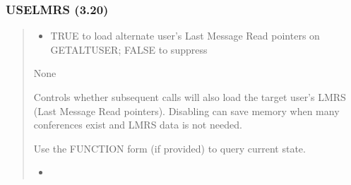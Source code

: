 \documentclass[letterpaper,10pt,english]{sphinxmanual}
\begin{document}
\subsubsection{USELMRS (3.20)}
\label{\detokenize{ppl:uselmrs-3-20}}\begin{quote}

\sphinxAtStartPar
{}
\begin{description}
\begin{itemize}
\item {} 
\sphinxAtStartPar
{} \textendash{} TRUE to load alternate user’s Last Message Read pointers on GETALTUSER; FALSE to suppress

\end{itemize}

\sphinxAtStartPar
None

\sphinxAtStartPar
Controls whether subsequent  calls will also load the target user’s LMRS (Last Message Read pointers).
Disabling can save memory when many conferences exist and LMRS data is not needed.

\end{description}

\sphinxAtStartPar
{}
\begin{quote}

\begin{sphinxVerbatim}[commandchars=\\\{\}]
 
 
 
 
 
 
\end{sphinxVerbatim}
\end{quote}
\begin{description}
\sphinxAtStartPar
Use the FUNCTION form  (if provided) to query current state.

\begin{itemize}
\item {} 
\sphinxAtStartPar
{}

\end{itemize}

\end{description}
\end{quote}
\end{document}
